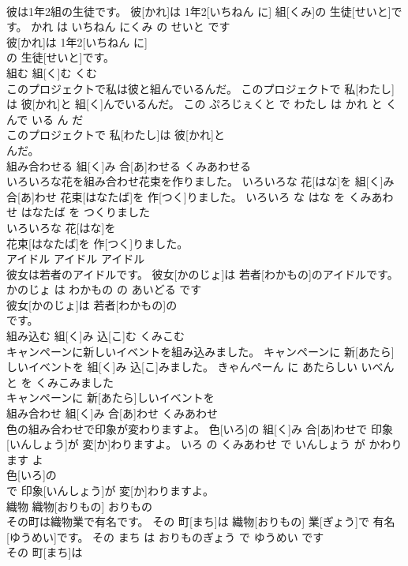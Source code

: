 \documentclass[8pt]{extreport}
\begin{document}
\begin{CJK}{UTF8}{min}
\\	彼は1年2組の生徒です。	彼[かれ]は 1年2[いちねん に] 組[くみ]の 生徒[せいと]です。	かれ は いちねん にくみ の せいと です	
\\	彼[かれ]は 1年2[いちねん に]
\\	の 生徒[せいと]です。			
\\	組む	組[く]む	くむ	
\\	このプロジェクトで私は彼と組んでいるんだ。	このプロジェクトで 私[わたし]は 彼[かれ]と 組[く]んでいるんだ。	この ぷろじぇくと で わたし は かれ と くんで いる ん だ	
\\	このプロジェクトで 私[わたし]は 彼[かれ]と
\\	んだ。			
\\	組み合わせる	組[く]み 合[あ]わせる	くみあわせる	
\\	いろいろな花を組み合わせ花束を作りました。	いろいろな 花[はな]を 組[く]み 合[あ]わせ 花束[はなたば]を 作[つく]りました。	いろいろ な はな を くみあわせ はなたば を つくりました	
\\	いろいろな 花[はな]を
\\	花束[はなたば]を 作[つく]りました。			
\\	アイドル	アイドル	アイドル	
\\	彼女は若者のアイドルです。	彼女[かのじょ]は 若者[わかもの]のアイドルです。	かのじょ は わかもの の あいどる です	
\\	彼女[かのじょ]は 若者[わかもの]の
\\	です。			
\\	組み込む	組[く]み 込[こ]む	くみこむ	
\\	キャンペーンに新しいイベントを組み込みました。	キャンペーンに 新[あたら]しいイベントを 組[く]み 込[こ]みました。	きゃんぺーん に あたらしい いべんと を くみこみました	
\\	キャンペーンに 新[あたら]しいイベントを
\\	組み合わせ	組[く]み 合[あ]わせ	くみあわせ	
\\	色の組み合わせで印象が変わりますよ。	色[いろ]の 組[く]み 合[あ]わせで 印象[いんしょう]が 変[か]わりますよ。	いろ の くみあわせ で いんしょう が かわります よ	
\\	色[いろ]の
\\	で 印象[いんしょう]が 変[か]わりますよ。			
\\	織物	織物[おりもの]	おりもの	
\\	その町は織物業で有名です。	その 町[まち]は 織物[おりもの] 業[ぎょう]で 有名[ゆうめい]です。	その まち は おりものぎょう で ゆうめい です	
\\	その 町[まち]は

\end{CJK}
\end{document}
